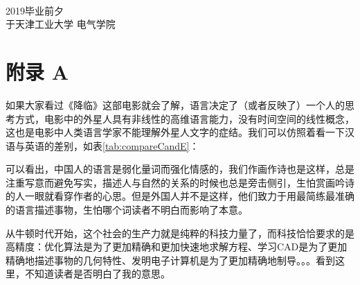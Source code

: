 \documentclass[UTF8,oneside]{ctexbook}
\begin{document}
\hspace{4cm}\\
\noindent2019毕业前夕\\
于天津工业大学 \quad 电气学院







\chapter*{附录 A}\label{fuluA}
如果大家看过《降临》这部电影就会了解，语言决定了（或者反映了）一个人的思考方式，电影中的外星人具有非线性的高维语言能力，没有时间空间的线性概念，这也是电影中人类语言学家不能理解外星人文字的症结。我们可以仿照着看一下汉语与英语的差别，如表\ref{tab:compareCandE}：

\begin{table}[!htb]
	\renewcommand{\arraystretch}{1.3} %
	\caption{中英对比}\label{tab:compareCandE}
	\centering
	\vspace{0.2cm}
\end{table}

可以看出，中国人的语言是弱化量词而强化情感的，我们作画作诗也是这样，总是注重写意而避免写实，描述人与自然的关系的时候也总是旁击侧引，生怕赏画吟诗的人一眼就看穿作者的心思。但是外国人并不是这样，他们致力于用最简练最准确的语言描述事物，生怕哪个词读者不明白而影响了本意。

从牛顿时代开始，这个社会的生产力就是纯粹的科技力量了，而科技恰恰要求的是高精度：优化算法是为了更加精确和更加快速地求解方程、学习CAD是为了更加精确地描述事物的几何特性、发明电子计算机是为了更加精确地制导。。。看到这里，不知道读者是否明白了我的意思。
\end{document}
